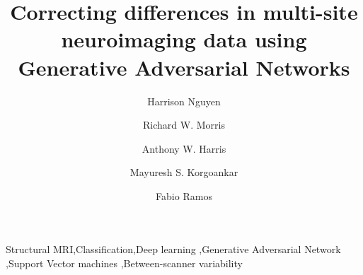 \documentclass[3p,twocolumn]{elsarticle}
\begin{document}
\begin{frontmatter}

\title{Correcting differences in multi-site neuroimaging data using Generative Adversarial Networks}

\author[address1]{Harrison Nguyen}
%
%
\author[address2,address3]{Richard W. Morris}
\author[address2,address4]{Anthony W. Harris}
\author[address2,address4]{Mayuresh S. Korgoankar}
\author[address1,address3]{Fabio Ramos}
%
%

\address[address1]{School of Information Technologies, University of Sydney, Sydney, Australia}
\address[address2]{School of Medicine, University of Sydney, Sydney, Australia}
\address[address3]{Centre for Translational Datascience, University of Sydney, Sydney, Australia}
\address[address4]{Brain Dynamics Centre, Westmead Millennium Institute, Sydney, Australia}


\begin{abstract}

\end{abstract}

\begin{keyword}
Structural MRI\sep Classification\sep Deep learning \sep Generative Adversarial Network \sep Support Vector machines \sep Between-scanner variability
\end{keyword}

\end{frontmatter}









\end{document}
